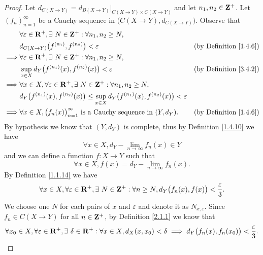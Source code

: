 \begin{proof}
    Let \(d_{C(X \to Y)} = d_{B(X \to Y)}|_{C(X \to Y) \times C(X \to Y)}\) and let \(n_1, n_2 \in \mathbf{Z}^+\).
    Let \((f_n)_{n = 1}^\infty\) be a Cauchy sequence in \(\big(C(X \to Y), d_{C(X \to Y)}\big)\).
    Observe that
    \begin{align*}
                 & \forall \varepsilon \in \mathbf{R}^+, \exists\ N \in \mathbf{Z}^+ : \forall n_1, n_2 \geq N,                                                                           \\
                 & d_{C(X \to Y)}\big(f^{(n_1)}, f^{(n_2)}\big) < \varepsilon                                                        & \text{(by Definition \ref{1.4.6})} \\
        \implies & \forall \varepsilon \in \mathbf{R}^+, \exists\ N \in \mathbf{Z}^+ : \forall n_1, n_2 \geq N,                                                                           \\
                 & \sup_{x \in X} d_Y\big(f^{(n_1)}(x), f^{(n_2)}(x)\big) < \varepsilon                                              & \text{(by Definition \ref{3.4.2})} \\
        \implies & \forall x \in X, \forall \varepsilon \in \mathbf{R}^+, \exists\ N \in \mathbf{Z}^+ : \forall n_1, n_2 \geq N,                                                          \\
                 & d_Y\big(f^{(n_1)}(x), f^{(n_2)}(x)\big) \leq \sup_{x \in X} d_Y\big(f^{(n_1)}(x), f^{(n_2)}(x)\big) < \varepsilon                                      \\
        \implies & \forall x \in X, \big(f_n(x)\big)_{n = 1}^\infty \text{ is a Cauchy sequence in } (Y, d_Y).                       & \text{(by Definition \ref{1.4.6})}
    \end{align*}
    By hypothesis we know that \((Y, d_Y)\) is complete, thus by Definition \ref{1.4.10} we have
    \[
        \forall x \in X, d_Y - \lim_{n \to \infty} f_n(x) \in Y
    \]
    and we can define a function \(f : X \to Y\) such that
    \[
        \forall x \in X, f(x) = d_Y - \lim_{n \to \infty} f_n(x).
    \]
    By Definition \ref{1.1.14} we have
    \[
        \forall x \in X, \forall \varepsilon \in \mathbf{R}^+, \exists\ N \in \mathbf{Z}^+ : \forall n \geq N, d_Y\big(f_n(x), f(x)\big) < \frac{\varepsilon}{3}.
    \]
    We choose one \(N\) for each pairs of \(x\) and \(\varepsilon\) and denote it as \(N_{x, \varepsilon}\).
    Since \(f_n \in C(X \to Y)\) for all \(n \in \mathbf{Z}^+\), by Definition \ref{2.1.1} we know that
    \[
        \forall x_0 \in X, \forall \varepsilon \in \mathbf{R}^+, \exists\ \delta \in \mathbf{R}^+ : \forall x \in X, d_X(x, x_0) < \delta \implies d_Y\big(f_n(x), f_n(x_0)\big) < \frac{\varepsilon}{3}.
\]
\end{proof}
